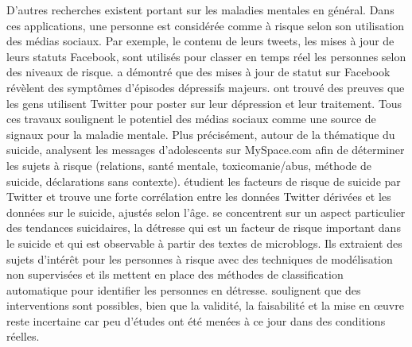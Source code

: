 D’autres recherches existent portant sur les  maladies mentales en général. Dans ces applications, une personne est considérée comme à risque selon son utilisation des médias sociaux. Par exemple, le contenu de leurs tweets, les mises à jour de leurs statuts Facebook, sont utilisés pour classer en temps réel les personnes selon des niveaux de risque.   \cite{citeulike:12521251}  a démontré que des mises à jour de statut sur Facebook révèlent des symptômes d'épisodes dépressifs majeurs. \cite{park2012} ont trouvé des preuves que les gens utilisent Twitter pour poster sur leur dépression et leur traitement. Tous ces travaux soulignent le potentiel des médias sociaux comme une source de signaux pour la maladie mentale. 
Plus précisément, autour de la thématique du suicide, \cite{CashTPFB13}  analysent les messages d’adolescents sur MySpace.com afin de déterminer les sujets à risque (relations, santé mentale, toxicomanie/abus, méthode de suicide, déclarations sans contexte). \cite{Jashinsky14}  étudient les facteurs de risque de suicide par Twitter et trouve une forte corrélation entre les données Twitter dérivées et les données sur le suicide, ajustés selon l'âge. \cite{HomanSS13}  se concentrent sur un aspect particulier des tendances suicidaires, la détresse qui est un facteur de risque important dans le suicide et qui est observable à partir des textes de microblogs. Ils extraient des sujets d'intérêt pour les personnes à risque avec des techniques de modélisation non supervisées et ils mettent en place des méthodes de classification automatique pour identifier les personnes en détresse. \cite{Christensen} soulignent que des interventions sont possibles, bien que la validité, la faisabilité et la mise en œuvre reste incertaine car peu d'études ont été menées à ce jour dans des conditions réelles.

